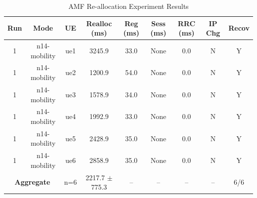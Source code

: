 \begin{table}[ht]
\centering
\begin{tabular}{|c|c|c|c|c|c|c|c|c|}
\hline
Run & Mode & UE & Realloc (ms) & Reg (ms) & Sess (ms) & RRC (ms) & IP Chg & Recov \\
\hline
1 & n14-mobility & ue1 & 3245.9 & 33.0 & None & 0.0 & N & Y \\
1 & n14-mobility & ue2 & 1200.9 & 54.0 & None & 0.0 & N & Y \\
1 & n14-mobility & ue3 & 1578.9 & 34.0 & None & 0.0 & N & Y \\
1 & n14-mobility & ue4 & 1992.9 & 33.0 & None & 0.0 & N & Y \\
1 & n14-mobility & ue5 & 2428.9 & 35.0 & None & 0.0 & N & Y \\
1 & n14-mobility & ue6 & 2858.9 & 35.0 & None & 0.0 & N & Y \\
\multicolumn{2}{|c|}{\textbf{Aggregate}} & n=6 & 2217.7 $\pm$ 775.3 & -- & -- & -- & -- & 6/6 \\
\hline
\end{tabular}
\caption{AMF Re-allocation Experiment Results}
\label{tab:amf_realloc}
\end{table}
